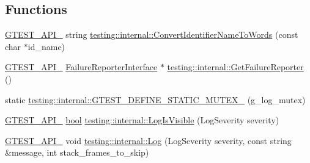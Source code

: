 \subsection*{Functions}
\begin{DoxyCompactItemize}
\item 
\hyperlink{gtest-port_8h_aa73be6f0ba4a7456180a94904ce17790}{G\+T\+E\+S\+T\+\_\+\+A\+P\+I\+\_\+} string \hyperlink{namespacetesting_1_1internal_a571db854f6de337007c53573c9cbf8a3}{testing\+::internal\+::\+Convert\+Identifier\+Name\+To\+Words} (const char $\ast$id\+\_\+name)
\item 
\hyperlink{gtest-port_8h_aa73be6f0ba4a7456180a94904ce17790}{G\+T\+E\+S\+T\+\_\+\+A\+P\+I\+\_\+} \hyperlink{classFailureReporterInterface}{Failure\+Reporter\+Interface} $\ast$ \hyperlink{namespacetesting_1_1internal_aa261c22df383e9007129c92e36e30e62}{testing\+::internal\+::\+Get\+Failure\+Reporter} ()
\item 
static \hyperlink{namespacetesting_1_1internal_a65647f11a4a74a4282c3cc6d422af0f1}{testing\+::internal\+::\+G\+T\+E\+S\+T\+\_\+\+D\+E\+F\+I\+N\+E\+\_\+\+S\+T\+A\+T\+I\+C\+\_\+\+M\+U\+T\+E\+X\+\_\+} (g\+\_\+log\+\_\+mutex)
\item 
\hyperlink{gtest-port_8h_aa73be6f0ba4a7456180a94904ce17790}{G\+T\+E\+S\+T\+\_\+\+A\+P\+I\+\_\+} \hyperlink{classbool}{bool} \hyperlink{namespacetesting_1_1internal_a69ffdba5ee36743e88d8f89b79e566ff}{testing\+::internal\+::\+Log\+Is\+Visible} (Log\+Severity severity)
\item 
\hyperlink{gtest-port_8h_aa73be6f0ba4a7456180a94904ce17790}{G\+T\+E\+S\+T\+\_\+\+A\+P\+I\+\_\+} void \hyperlink{namespacetesting_1_1internal_ac0bc151763a8187d74387c4b2ba685c9}{testing\+::internal\+::\+Log} (Log\+Severity severity, const string \&message, int stack\+\_\+frames\+\_\+to\+\_\+skip)
\end{DoxyCompactItemize}
